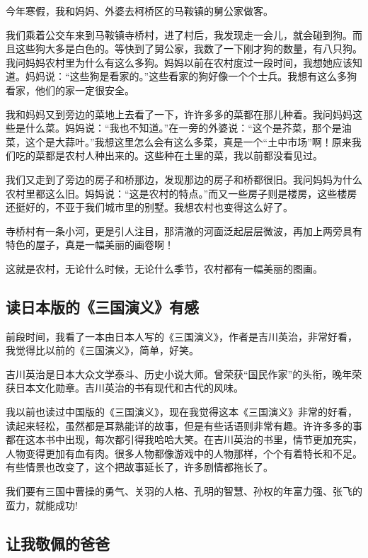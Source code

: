 \documentclass[UTF8,a4paper,titlepage,twoside,10.5pt]{article}
\begin{document}
今年寒假，我和妈妈、外婆去柯桥区的马鞍镇的舅公家做客。

我们乘着公交车来到马鞍镇寺桥村，进了村后，我发现走一会儿，就会碰到狗。而且这些狗大多是白色的。等快到了舅公家，我数了一下刚才狗的数量，有八只狗。我问妈妈农村里为什么有这么多狗。妈妈以前在农村度过一段时间，我想她应该知道。妈妈说：“这些狗是看家的。”这些看家的狗好像一个个士兵。我想有这么多狗看家，他们的家一定很安全。

我和妈妈又到旁边的菜地上去看了一下，许许多多的菜都在那儿种着。我问妈妈这些是什么菜。妈妈说：“我也不知道。”在一旁的外婆说：“这个是芥菜，那个是油菜，这个是大蒜叶。”我想这里怎么会有这么多菜，真是一个“土中市场”啊！原来我们吃的菜都是农村人种出来的。这些种在土里的菜，我以前都没看见过。

我们又走到了旁边的房子和桥那边，发现那边的房子和桥都很旧。我问妈妈为什么农村里都这么旧。妈妈说：“这是农村的特点。”而又一些房子则是楼房，这些楼房还挺好的，不亚于我们城市里的别墅。我想农村也变得这么好了。

寺桥村有一条小河，更是引人注目，那清澈的河面泛起层层微波，再加上两旁具有特色的屋子，真是一幅美丽的画卷啊！

这就是农村，无论什么时候，无论什么季节，农村都有一幅美丽的图画。

\subsection{读日本版的《三国演义》有感}
\label{sec:org77d3fa8}

前段时间，我看了一本由日本人写的《三国演义》，作者是吉川英治，非常好看，我觉得比以前的《三国演义》，简单，好笑。

吉川英治是日本大众文学泰斗、历史小说大师。曾荣获“国民作家”的头衔，晚年荣获日本文化勋章。吉川英治的书有现代和古代的风味。

我以前也读过中国版的《三国演义》，现在我觉得这本《三国演义》非常的好看，读起来轻松，虽然都是耳熟能详的故事，但是有些话语则非常有趣。许许多多的事都在这本书中出现，每次都引得我哈哈大笑。在吉川英治的书里，情节更加充实，人物变得更加有血有肉。很多人物都像游戏中的人物那样，个个有着特长和不足。有些情景也改变了，这个把故事延长了，许多剧情都拖长了。

我们要有三国中曹操的勇气、关羽的人格、孔明的智慧、孙权的年富力强、张飞的蛮力，就能成功!

\subsection{让我敬佩的爸爸}
\label{sec:orgfd47c0b}
\end{document}

